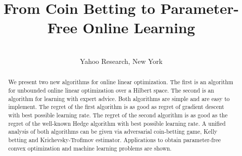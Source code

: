 \documentclass[wcp]{jmlr}
\author{%
\Name{Francesco Orabona}
\Email{francesco@orabona.com}
\AND
\Name{D\'avid P\'al}
\Email{dpal@yahoo-inc.com}\\
\addr Yahoo Research, New York}
\title{From Coin Betting to Parameter-Free Online Learning}
\begin{document}
\maketitle

\begin{abstract}
We present two new algorithms for online linear optimization.  The first is an
algorithm for unbounded online linear optimization over a Hilbert space.  The
second is an algorithm for learning with expert advice. Both algorithms are
simple and are easy to implement.  The regret of the first algorithm is as good
as regret of gradient descent with best possible learning rate. The regret of
the second algorithm is as good as the regret of the well-known Hedge algorithm
with best possible learning rate. A unified analysis of both algorithms can be
given via adversarial coin-betting game, Kelly betting and Krichevsky-Trofimov
estimator. Applications to obtain parameter-free convex optimization and machine learning problems are shown.
\end{abstract}



%
%



%
%
%
%
%




\appendix
%
%
%
%
\end{document}
